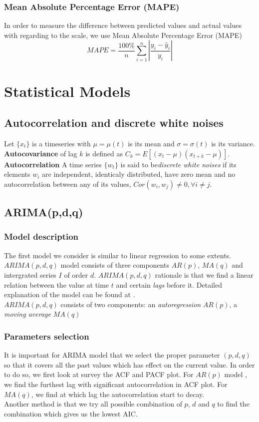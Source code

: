 \documentclass[11pt]{article}
\begin{document}
\subsubsection{Mean Absolute Percentage Error (MAPE)}
In order to measure the difference between predicted values and actual values
with regarding to the scale, we use Mean Absolute Percentage Error (MAPE)
$$
MAPE = \frac{100\%}{n}\sum  _{i=1}^{n}\left| \frac{y_i -\hat{y}_i}{y_i} \right|
$$


\section{Statistical Models}
\subsection{Autocorrelation and discrete white noises}
Let $\{x_t\}$ is a timeseries with $\mu=\mu(t)$ is its mean and
$\sigma=\sigma(t)$ is its variance. \textbf{Autocovariance} of lag $k$ is
defined as $C_k=E[(x_t-\mu)(x_{t+k}-\mu)]$. \textbf{Autocorrelation} 
A time series $\{w_t\}$ is said to be\textit{discrete white noises} if its
elements $w_i$ are independent, identicaly distributed, have zero mean and no
autocorrelation between any of its values, $Cor(w_i,w_j)\neq 0, \forall i \neq
j$.

\subsection{ARIMA(p,d,q)}
\subsubsection{Model description}
The first model we consider is similar to linear regression to some extents.
$ARIMA(p,d,q)$ model consists of three components $AR(p)$, $MA(q)$ and
intergrated series $I$ of order $d$. $ARIMA(p,d,q)$ rationale is that we find a
linear relation between the value at time $t$ and certain \textit{lags} before
it. Detailed explanation of the model can be found at \cite{GVK4844634242}.\\
$ARIMA(p,d,q)$ consists of two components: an \textit{autoregression} $AR(p)$, a
\textit{moving average} $MA(q)$

\subsubsection{Parameters selection}
It is important for ARIMA model that we select the proper parameter $(p, d, q)$
so that it covers all the past values which has effect on the current value. In
order to do so, we first look at survey the ACF and PACF plot. For $AR(p)$ model
, we find the furthest lag with significant autocorrelation in ACF plot. For
$MA(q)$, we find at which lag the autocorrelation start to decay.\\
Another method is that we try all possible combination of $p$, $d$ and $q$ to
find the combination which gives us the lowest AIC.
\end{document}
